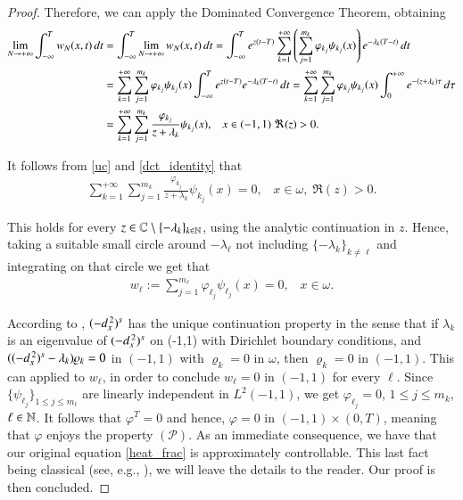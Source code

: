 \begin{proof}
Therefore, we can apply the Dominated Convergence Theorem, obtaining
\begin{align}\label{dct_identity}
	\lim_{N\to+\infty}\int_{-\infty}^T w_N(x,t)\,dt &= \int_{-\infty}^T\lim_{N\to+\infty} w_N(x,t)\,dt = \int_{-\infty}^T e^{z(t-T)} \sum_{k=1}^{+\infty} \left(\sum_{j=1}^{m_k} \varphi_{k_j}\psi_{k_j}(x)\right)e^{-\lambda_k(T-t)}\,dt \notag
	\\
	&=\sum_{k=1}^{+\infty}\sum_{j=1}^{m_k} \varphi_{k_j}\psi_{k_j}(x) \int_{-\infty}^T e^{z(t-T)}e^{-\lambda_k(T-t)}\,dt =\sum_{k=1}^{+\infty}\sum_{j=1}^{m_k} \varphi_{k_j}\psi_{k_j}(x) \int_0^{+\infty} e^{-(z+\lambda_k)\tau}\,d\tau \notag
	\\
	&=\sum_{k=1}^{+\infty}\sum_{j=1}^{m_k} \frac{\varphi_{k_j}}{z+\lambda_k}\psi_{k_j}(x), \;\;\; x\in (-1,1)\;\Re(z)>0.
\end{align} 

It follows from \eqref{uc} and \eqref{dct_identity} that 
\begin{align*}
	\sum_{k=1}^{+\infty}\sum_{j=1}^{m_k} \frac{\varphi_{k_j}}{z+\lambda_k}\psi_{k_j}(x)=0, \;\;\; x\in\omega,\;\Re(z)>0.
\end{align*}

This holds for every $z\in\mathbb{C}\setminus\{-\lambda_k\}_{k\in\mathbb{N}}$, using the analytic continuation in $z$. Hence, taking a suitable small circle around $-\lambda_{\ell}$ not including $\{-\lambda_k\}_{k\neq\ell}$ and integrating on that circle we get that
\begin{align*}
	w_\ell:=\sum_{j=1}^{m_{\ell}} \varphi_{\ell_j}\psi_{\ell_j}(x)=0, \;\;\; x\in\omega.
\end{align*}

According to \cite[Theorem 1.4]{fall2014unique}, $(-d_x^{\,2})^{s}$ has the unique continuation property in the sense that if $\lambda_k$ is an eigenvalue of $(-d_x^{\,2})^{s}$ on (-1,1) with Dirichlet boundary conditions, and $((-d_x^{\,2})^{s}-\lambda_k)\varrho_k = 0$ in $(-1,1)$ with $\varrho_k = 0$ in $\omega$, then $\varrho_k = 0$ in $(-1,1)$. 
This can applied to $w_{\ell}$, in order to conclude $w_{\ell} = 0$ in $(-1,1)$ for every $\ell$. Since $\{\psi_{\ell_j}\}_{1\leq j\leq m_{\ell}}$ are linearly independent in $L^2(-1,1)$, we get $\varphi_{\ell_j} = 0$, $1\leq j\leq m_k$, $\ell\in\mathbb{N}$. It follows that $\varphi^T=0$ and hence, $\varphi=0$ in $(-1,1)\times(0,T)$, meaning that $\varphi$ enjoys the property $(\mathcal{P})$. As an immediate consequence, we have that our original equation \eqref{heat_frac} is approximately controllable. This last fact being classical (see, e.g., \cite[Theorem 2.5]{keyantuo2016interior}), we will leave the details to the reader. Our proof is then concluded. 
\end{proof}



